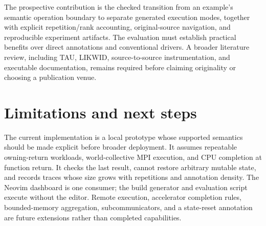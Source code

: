 \documentclass[10pt]{article}
\begin{document}
The prospective contribution is the checked transition from an example's semantic
operation boundary to separate generated execution modes, together with explicit
repetition/rank accounting, original-source navigation, and reproducible experiment
artifacts. The evaluation must establish practical benefits over direct annotations
and conventional drivers. A broader literature review, including TAU, LIKWID,
source-to-source instrumentation, and executable documentation, remains required
before claiming originality or choosing a publication venue.

\section{Limitations and next steps}
The current implementation is a local prototype whose supported semantics should be
made explicit before broader deployment. It assumes repeatable owning-return workloads,
world-collective MPI execution, and CPU completion at function return. It checks the
last result, cannot restore arbitrary mutable state, and records traces whose size
grows with repetitions and annotation density. The Neovim dashboard is one consumer;
the build generator and evaluation script execute without the editor. Remote execution,
accelerator completion rules, bounded-memory aggregation, subcommunicators, and a
state-reset annotation are future extensions rather than completed capabilities.



\end{document}

